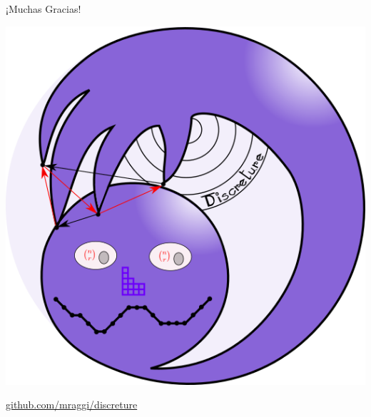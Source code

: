 \documentclass[spanish,professionalfonts]{beamer}
\begin{document}
\begin{frame}\frametitle{}
\begin{center}
	\huge{¡Muchas Gracias!}
\end{center}
	
	\begin{center}
		\includegraphics[scale=1]{logoteregrande.png}
	\end{center}
	
\huge{\url{github.com/mraggi/discreture}}
\end{frame}
\end{document}
